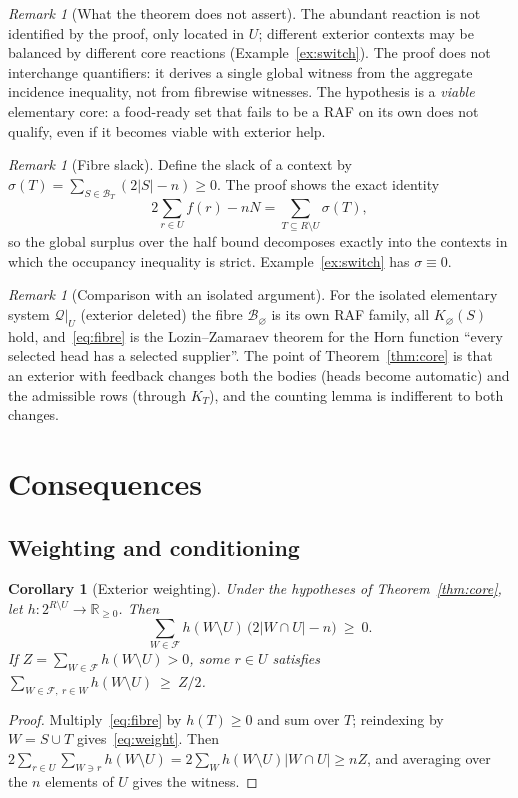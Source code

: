 \documentclass[11pt,a4paper]{article}
\theoremstyle{plain}
\newtheorem{corollary}[theorem]{Corollary}
\theoremstyle{definition}
\theoremstyle{remark}
\newtheorem{remark}[theorem]{Remark}
\newcommand{\FF}{\mathcal F}
\newcommand{\BB}{\mathcal B}
\newcommand{\QQ}{\mathcal Q}
\newcommand{\R}{\mathbb R}
\begin{document}
\begin{remark}[What the theorem does not assert]
The abundant reaction is not identified by the proof, only located in $U$; different
exterior contexts may be balanced by different core reactions (Example~\ref{ex:switch}).
The proof does not interchange quantifiers: it derives a single global witness from the
aggregate incidence inequality, not from fibrewise witnesses. The hypothesis is a
\emph{viable} elementary core: a food-ready set that fails to be a RAF on its own does not
qualify, even if it becomes viable with exterior help.
\end{remark}

\begin{remark}[Fibre slack]\label{rem:slack}
Define the slack of a context by $\sigma(T)=\sum_{S\in\BB_T}(2|S|-n)\ge0$. The proof shows
the exact identity
\[
2\sum_{r\in U}f(r)-nN=\sum_{T\subseteq R\setminus U}\sigma(T),
\]
so the global surplus over the half bound decomposes exactly into the contexts in which the
occupancy inequality is strict. Example~\ref{ex:switch} has $\sigma\equiv0$.
\end{remark}

\begin{remark}[Comparison with an isolated argument]
For the isolated elementary system $\QQ|_U$ (exterior deleted) the fibre $\BB_\varnothing$
is its own RAF family, all $K_\varnothing(S)$ hold, and~\eqref{eq:fibre} is the
Lozin--Zamaraev theorem for the Horn function ``every selected head has a selected
supplier''. The point of Theorem~\ref{thm:core} is that an exterior with feedback changes
both the bodies (heads become automatic) and the admissible rows (through $K_T$), and the
counting lemma is indifferent to both changes.
\end{remark}

\section{Consequences}\label{sec:consequences}

\subsection{Weighting and conditioning}

\begin{corollary}[Exterior weighting]\label{cor:weight}
Under the hypotheses of Theorem~\ref{thm:core}, let $h:2^{R\setminus U}\to\R_{\ge0}$. Then
\begin{equation}\label{eq:weight}
\sum_{W\in\FF}h(W\setminus U)\,\bigl(2|W\cap U|-n\bigr)\ \ge\ 0 .
\end{equation}
If $Z=\sum_{W\in\FF}h(W\setminus U)>0$, some $r\in U$ satisfies
$\sum_{W\in\FF,\ r\in W}h(W\setminus U)\ \ge\ Z/2$.
\end{corollary}
\begin{proof}
Multiply~\eqref{eq:fibre} by $h(T)\ge0$ and sum over $T$; reindexing by $W=S\cup T$
gives~\eqref{eq:weight}. Then
$2\sum_{r\in U}\sum_{W\ni r}h(W\setminus U)=2\sum_W h(W\setminus U)|W\cap U|\ge nZ$, and
averaging over the $n$ elements of $U$ gives the witness.
\end{proof}
\end{document}
